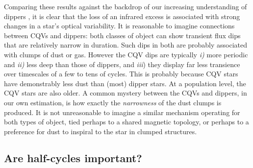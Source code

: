 \documentclass[11pt,twocolumn,tighten]{aastex63}
\begin{document}
Comparing these results against the backdrop of our increasing
understanding of dippers
\citep[e.g.][]{2014AJ....147...82C,2016ApJ...816...69A,2021ApJ...908...16R,2022ApJS..263...14C},
it is clear that the loss of an infrared excess is associated with
strong changes in a star's optical variability.  It is reasonable to
imagine connections between CQVs and dippers: both classes of object
can show transient flux dips that are relatively narrow in duration.
Such dips in both are probably associated with clumps of dust or gas.
However the CQV dips are typically {\it i)} more periodic and {\it
ii)} less deep than those of dippers, and {\it iii}) they display far
less transience over timescales of a few to tens of cycles.  This is
probably because CQV stars have demonstrably less dust than (most)
dipper stars.  At a population level, the CQV stars are also older.  A
common mystery between the CQVs and dippers, in our own estimation, is
how exactly the {\it narrowness} of the dust clumps is produced.  It
is not unreasonable to imagine a similar mechanism operating for both
types of object, tied perhaps to a shared magnetic topology, or
perhaps to a preference for dust to inspiral to the star in clumped
structures.


%


\subsection{Are half-cycles important?}
\end{document}
